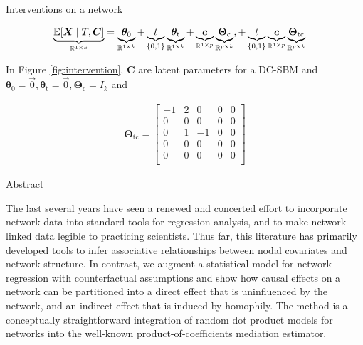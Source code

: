 \documentclass{beamer}
\theoremstyle{remark}
\renewcommand{\c}{\bm c}
\newcommand{\C}{\bm C}
\newcommand{\X}{\bm X}
\newcommand{\thetazero}{\bm \theta_0}
\newcommand{\thetat}{\bm \theta_\text{t}}
\newcommand{\Thetac}{\bm \Theta_\text{c}}
\newcommand{\Thetatc}{\bm \Theta_\text{tc}}
\DeclarePairedDelimiter{\brac}{[}{]}
\newcommand{\E}[2][]{%
   \ifthenelse{ \equal{#1}{} }
      {\ensuremath{\mathbb{E} \brac*{#2}}}
      {\ensuremath{\mathbb{E} \brac*{#2 \mid #1}}}
}
\begin{document}
\begin{frame}{Interventions on a network}

    \begin{align*}
        \underbrace{\E[T, \C]{\X}}_{\mathbb R^{1 \times k}}
         & = \underbrace{\thetazero}_{\mathbb R^{1 \times k}}
        + \underbrace{t}_{\{0, 1\}} \underbrace{\thetat}_{\mathbb R^{1 \times k}}
        + \underbrace{\c}_{\mathbb R^{1 \times p}} \underbrace{\Thetac}_{\mathbb R^{p \times k}},
        + \underbrace{t}_{\{0, 1\}} \underbrace{\c}_{\mathbb R^{1 \times p}} \underbrace{\Thetatc}_{\mathbb R^{p \times k}}
    \end{align*}

    In Figure \ref{fig:intervention}, $\C$ are latent parameters for a DC-SBM and $\thetazero = \vec 0, \thetat = \vec 0, \Thetac = I_k$ and

    \begin{align*}
        \Thetatc =
        \begin{bmatrix}
            -1 & 2 & 0  & 0 & 0 \\
            0  & 0 & 0  & 0 & 0 \\
            0  & 1 & -1 & 0 & 0 \\
            0  & 0 & 0  & 0 & 0 \\
            0  & 0 & 0  & 0 & 0 \\
        \end{bmatrix}
    \end{align*}
\end{frame}

\begin{frame}{Abstract}

    The last several years have seen a renewed and concerted effort to incorporate network data into standard tools for regression analysis, and to make network-linked data legible to practicing scientists. Thus far, this literature has primarily developed tools to infer associative relationships between nodal covariates and network structure. In contrast, we augment a statistical model for network regression with counterfactual assumptions and show how causal effects on a network can be partitioned into a direct effect that is uninfluenced by the network, and an indirect effect that is induced by homophily. The method is a conceptually straightforward integration of random dot product models for networks into the well-known product-of-coefficients mediation estimator.

\end{frame}



\end{document}

